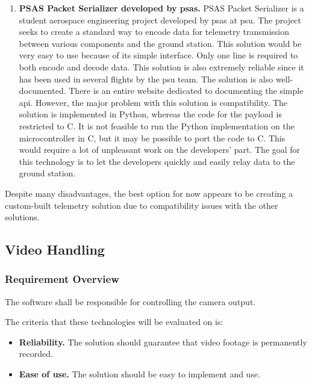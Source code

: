 \documentclass[letterpaper,10pt]{article}
\begin{document}
\begin{enumerate}
\item{
\textbf{PSAS Packet Serializer developed by \gls{psas}.}
PSAS Packet Serializer is a student aerospace engineering project developed by \gls{psas} at \gls{psu}. 
The project seeks to create a standard way to encode data for telemetry transmission between various components
and the ground station.
This solution would be very easy to use because of its simple interface.
Only one line is required to both encode and decode data.
This solution is also extremely reliable since it has been used in several flights by the \gls{psu} team.
The solution is also well-documented.
There is an entire website dedicated to documenting the simple \gls{api}.
However, the major problem with this solution is compatibility.
The solution is implemented in Python, whereas the code for the \gls{payload} is restricted to C.
It is not feasible to run the Python implementation on the microcontroller in C,
but it may be possible to \gls{port} the code to C.
This would require a lot of unpleasant work on the developers' part.
The goal for this technology is to let the developers quickly and easily relay data to the ground station.
}
\end{enumerate}
Despite many disadvantages, the best option for now appears to be creating a
custom-built telemetry solution due to compatibility issues with the other solutions.

\subsection{Video Handling}
\subsubsection{Requirement Overview}
The software shall be responsible for controlling the camera output.

The criteria that these technologies will be evaluated on is:
\begin{itemize}
\item \textbf{Reliability.}
The solution should guarantee that video footage is permanently recorded.

\item \textbf{Ease of use.}
The solution should be easy to implement and use.
\end{itemize}
\end{document}
